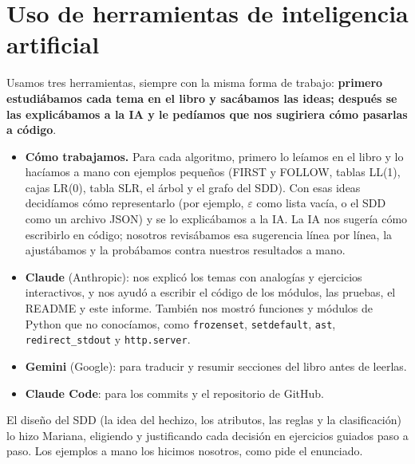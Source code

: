 \documentclass[11pt,a4paper]{article}
\newcommand{\code}[1]{\texttt{#1}}
\begin{document}
\section{Uso de herramientas de inteligencia artificial}

Usamos tres herramientas, siempre con la misma forma de trabajo: \textbf{primero estudiábamos cada tema en el libro y sacábamos las ideas; después se las explicábamos a la IA y le pedíamos que nos sugiriera cómo pasarlas a código}.

\begin{itemize}
  \item \textbf{Cómo trabajamos.} Para cada algoritmo, primero lo leíamos en el libro y lo hacíamos a mano con ejemplos pequeños (FIRST y FOLLOW, tablas LL(1), cajas LR(0), tabla SLR, el árbol y el grafo del SDD). Con esas ideas decidíamos cómo representarlo (por ejemplo, $\varepsilon$ como lista vacía, o el SDD como un archivo JSON) y se lo explicábamos a la IA. La IA nos sugería cómo escribirlo en código; nosotros revisábamos esa sugerencia línea por línea, la ajustábamos y la probábamos contra nuestros resultados a mano.
  \item \textbf{Claude} (Anthropic): nos explicó los temas con analogías y ejercicios interactivos, y nos ayudó a escribir el código de los módulos, las pruebas, el README y este informe. También nos mostró funciones y módulos de Python que no conocíamos, como \code{frozenset}, \code{setdefault}, \code{ast}, \code{redirect\_stdout} y \code{http.server}.
  \item \textbf{Gemini} (Google): para traducir y resumir secciones del libro antes de leerlas.
  \item \textbf{Claude Code}: para los commits y el repositorio de GitHub.
\end{itemize}

El diseño del SDD (la idea del hechizo, los atributos, las reglas y la clasificación) lo hizo Mariana, eligiendo y justificando cada decisión en ejercicios guiados paso a paso. Los ejemplos a mano los hicimos nosotros, como pide el enunciado.
\end{document}
